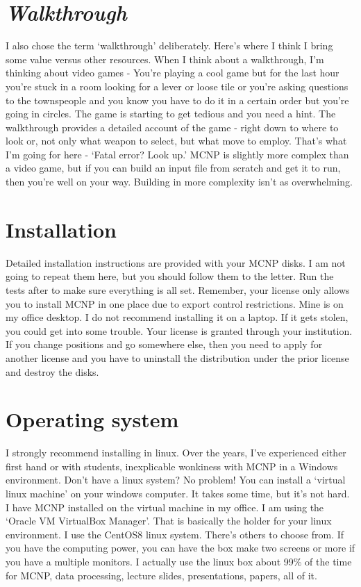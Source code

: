 \documentclass[11pt,a4paper]{article}
\begin{document}
\section{\textit{Walkthrough}}
\noindent I also chose the term `walkthrough' deliberately. Here's where I think I bring some value versus other resources. When I think about a walkthrough, I'm thinking about video games - You're playing a cool game but for the last hour you're stuck in a room looking for a lever or loose tile or you're asking questions to the townspeople and you know you have to do it in a certain order but you're going in circles. The game is starting to get tedious and you need a hint. The walkthrough provides a detailed account of the game - right down to where to look or, not only what weapon to select, but what move to employ. That's what I'm going for here - `Fatal error? Look up.' MCNP is slightly more complex than a video game, but if you can build an input file from scratch and get it to run, then you're well on your way. Building in more complexity isn't as overwhelming. 

\newpage


\section{Installation}
\noindent Detailed installation instructions are provided with your MCNP disks. I am not going to repeat them here, but you should follow them to the letter. Run the tests after to make sure everything is all set. Remember, your license only allows you to install MCNP in one place due to export control restrictions. Mine is on my office desktop. I do not recommend installing it on a laptop. If it gets stolen, you could get into some trouble. Your license is granted through your institution. If you change positions and go somewhere else, then you need to apply for another license and you have to uninstall the distribution under the prior license and destroy the disks. 

\section{Operating system}
\noindent I strongly recommend installing in linux. Over the years, I've experienced either first hand or with students, inexplicable wonkiness with MCNP in a Windows environment. Don't have a linux system? No problem! You can install a `virtual linux machine' on your windows computer. It takes some time, but it's not hard. I have MCNP installed on the virtual machine in my office. I am using the `Oracle VM VirtualBox Manager'. That is basically the holder for your linux environment. I use the CentOS8 linux system. There's others to choose from. If you have the computing power, you can have the box make two screens or more if you have a multiple monitors. I actually use the linux box about 99\% of the time for MCNP, data processing, lecture slides, presentations, papers, all of it. 
\end{document}
